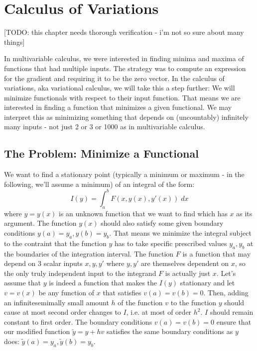 \section{Calculus of Variations} 

[TODO: this chapter needs thorough verification - i'm not so sure about many things]

In multivariable calculus, we were interested in finding minima and maxima of functions that had multiple inputs. The strategy was to compute an expression for the gradient and requiring it to be the zero vector. In the calculus of variations, aka variational calculus, we will take this a step further: We will minimize functionals with respect to their input function. That means we are interested in finding a function that minimizes a given functional. We may interpret this as minimizing something that depends on (uncountably) infinitely many inputs - not just 2 or 3 or 1000 as in multivariable calculus.


\subsection{The Problem: Minimize a Functional}
We want to find a stationary point (typically a minimum or maximum - in the following, we'll assume a minimum) of an integral of the form:
\begin{equation}
 I(y) = \int_a^b F(x,y(x),y'(x)) \; dx
\end{equation}
where $y = y(x)$ is an unknown function that we want to find which has $x$ as its argument. The function $y(x)$ should also satisfy some given boundary conditions $y(a) = y_a, y(b) = y_b$. That means we minimize the integral subject to the contraint that the function $y$ has to take specific prescribed values $y_a, y_b$ at the boundaries of the integration interval. The function $F$ is a function that may depend on 3 scalar inputs $x,y,y'$ where $y,y'$ are themselves dependent on $x$, so the only truly independent input to the integrand $F$ is actually just $x$. Let's assume that $y$ is indeed a function that makes the $I(y)$ stationary and let $v = v(x)$ be any function of $x$ that satisfies $v(a) = v(b) = 0$. Then, adding an infinitesemimally small amount $h$ of the function $v$ to the function $y$ should cause at most second order changes to $I$, i.e. at most of order $h^2$. $I$ should remain constant to first order. The boundary conditions $v(a) = v(b) = 0$ ensure that our modified function $\tilde{y} = y + h v$ satisfies the same boundary conditions as $y$ does: $\tilde{y}(a) = y_a, \tilde{y}(b) = y_b$.

